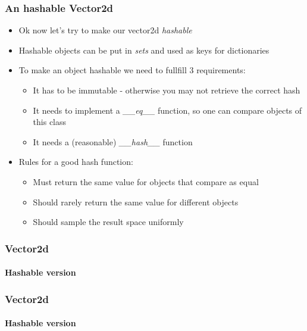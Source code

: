 \documentclass[9pt]{beamer}
\begin{document}
\begin{frame}
  \frametitle{An hashable Vector2d}
  
  \begin{itemize}
    \item Ok now let's try to make our vector2d \emph{hashable}
    \medskip
    \item Hashable objects can be put in \emph{sets} and used as keys for 
          dictionaries
    \medskip
    \item To make an object hashable we need to fullfill 3 requirements:
    \smallskip
    \begin{itemize}
      \item It has to be immutable - otherwise you may not retrieve the correct hash
      \smallskip
      \item It needs to implement a \emph{\_\_eq\_\_} function, so one can compare
            objects of this class
      \smallskip
      \item It needs a (reasonable) \emph{\_\_hash\_\_} function
    \end{itemize}
    \medskip
    \item Rules for a good hash function:
    \smallskip
    \begin{itemize}
      \item Must return the same value for objects that compare as equal
      \smallskip
      \item Should rarely return the same value for different objects
      \smallskip
      \item Should sample the result space uniformly
    \end{itemize}
    
  \end{itemize}
  
\end{frame}


\begin{frame}
  \frametitle{Vector2d}
  \framesubtitle{Hashable version}
  
\end{frame}


\begin{frame}
  \frametitle{Vector2d}
  \framesubtitle{Hashable version}
  
\end{frame}
\end{document}
